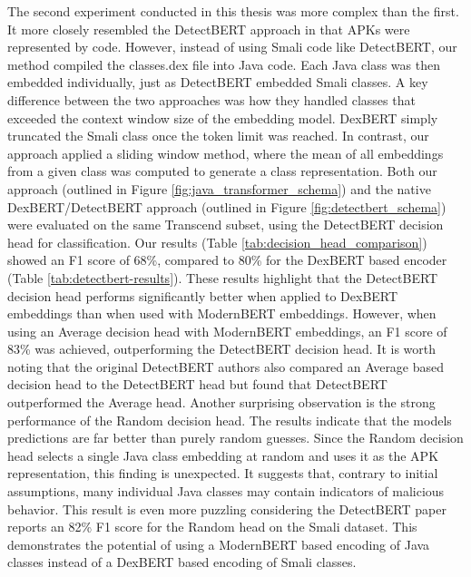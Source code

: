 The second experiment conducted in this thesis was more complex than the first.
It more closely resembled the DetectBERT approach in that APKs were represented by code.
However, instead of using Smali code like DetectBERT, our method compiled the classes.dex file into Java code.
Each Java class was then embedded individually, just as DetectBERT embedded Smali classes.
A key difference between the two approaches was how they handled classes that exceeded the context 
window size of the embedding model.
DexBERT simply truncated the Smali class once the token limit was reached.
In contrast, our approach applied a sliding window method, where the mean of all embeddings 
from a given class was computed to generate a class representation.
Both our approach (outlined in Figure \ref{fig:java_transformer_schema}) and the native DexBERT/DetectBERT 
approach (outlined in Figure \ref{fig:detectbert_schema}) were evaluated on the same Transcend subset, 
using the DetectBERT decision head for classification.
Our results (Table \ref{tab:decision_head_comparison}) showed an F1 score of 68\%, compared to 80\% for the DexBERT based 
encoder (Table \ref{tab:detectbert-results}).
These results highlight that the DetectBERT decision head performs significantly better when applied to DexBERT 
embeddings than when used with ModernBERT embeddings.
However, when using an Average decision head with ModernBERT embeddings, an F1 score of 83\% was achieved,
outperforming the DetectBERT decision head.
It is worth noting that the original DetectBERT authors also compared an Average based decision head to the 
DetectBERT head but found that DetectBERT outperformed the Average head.
Another surprising observation is the strong performance of the Random decision head.
The results indicate that the models predictions are far better than purely random guesses.
Since the Random decision head selects a single Java class embedding at random and uses it as the APK representation, 
this finding is unexpected.
It suggests that, contrary to initial assumptions, many individual Java classes may contain indicators of malicious behavior.
This result is even more puzzling considering the DetectBERT paper \cite{detectbert} reports an 82\% F1 score 
for the Random head on the Smali dataset.
This demonstrates the potential of using a ModernBERT based encoding of Java classes instead of a 
DexBERT based encoding of Smali classes.

